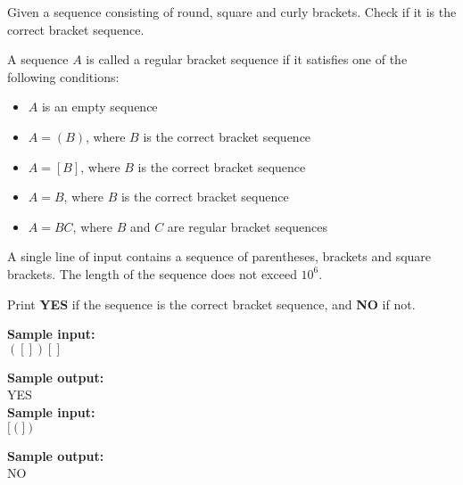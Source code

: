 \documentclass[a4paper]{article}
\begin{document}
Given a sequence consisting of round, square and curly brackets. Check if it is the correct bracket sequence.

A sequence $A$ is called a regular bracket sequence if it satisfies one of the following conditions:
\begin{itemize}
\item $A$ is an empty sequence
\item $A = (B)$, where $B$ is the correct bracket sequence
\item $A = [B]$, where $B$ is the correct bracket sequence
\item $A = {B}$, where $B$ is the correct bracket sequence
\item $A = BC$, where $B$ and $C$ are regular bracket sequences
\end{itemize}
A single line of input contains a sequence of parentheses, brackets and square brackets. The length of the sequence does not exceed $10^6$.

Print \textbf{YES} if the sequence is the correct bracket sequence, and \textbf{NO} if not.

\LINE

\noindent \textbf{Sample input:}\\
$([]{})[]$

\noindent \textbf{Sample output:}\\
YES\\


\noindent \textbf{Sample input:}\\
$[(])$

\noindent \textbf{Sample output:}\\
NO\\
\end{document}

